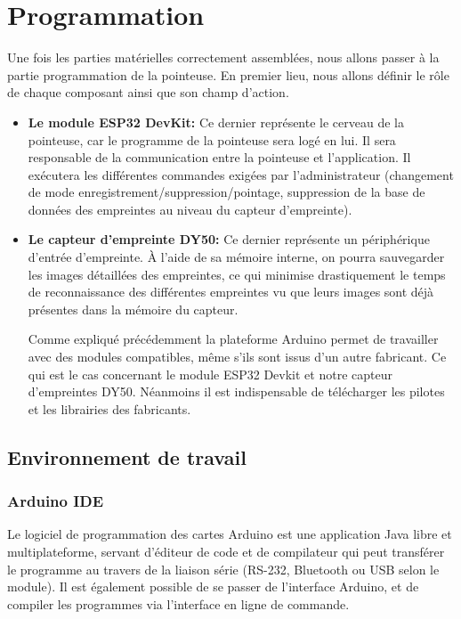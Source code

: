 \section{Programmation}
Une fois les parties matérielles correctement assemblées, nous allons passer à 
la partie programmation de la pointeuse. En premier lieu, nous allons définir 
le rôle de chaque composant ainsi que son champ d’action.

\begin{itemize}
    \item[\textbullet] \textbf{Le module ESP32 DevKit:} Ce dernier représente le
        cerveau de la pointeuse, car le programme de la pointeuse sera logé en
        lui. Il sera responsable de la communication entre la pointeuse et
        l’application. Il exécutera les différentes commandes exigées par
        l’administrateur (changement de mode
        enregistrement/suppression/pointage, suppression de la base de données
        des empreintes au niveau du capteur d’empreinte).  
    \item[\textbullet] \textbf{Le capteur d'empreinte DY50:} Ce dernier
        représente un périphérique d’entrée d’empreinte. À l’aide de sa mémoire
        interne, on pourra sauvegarder les images détaillées des empreintes, ce
        qui minimise drastiquement le temps de reconnaissance des différentes
        empreintes vu que leurs images sont déjà présentes dans la mémoire du
        capteur.

        Comme expliqué précédemment la plateforme Arduino permet de travailler
        avec des modules compatibles, même s’ils sont issus d’un autre
        fabricant. Ce qui est le cas concernant le module ESP32 Devkit et notre
        capteur d’empreintes DY50.  Néanmoins il est indispensable de
        télécharger les pilotes et les librairies des fabricants.    
\end{itemize}

\subsection{Environnement de travail}

\subsubsection{Arduino IDE }
Le logiciel de programmation des cartes Arduino est une application Java libre 
et multiplateforme, servant d'éditeur de code et de compilateur qui peut 
transférer le programme au travers de la liaison série (RS-232, Bluetooth ou USB 
selon le module). Il est également possible de se passer de l'interface Arduino, 
et de compiler les programmes via l'interface en ligne de commande.

